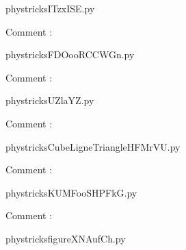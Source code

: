     \newcommand{\CaptionFigITzxISE}{<+Type your caption here+>}
    \begin{center}
        
    \end{center}
    phystricksITzxISE.py

    Comment : 

    \clearpage
    


    \newcommand{\CaptionFigFDOooRCCWGn}{<+Type your caption here+>}
    \begin{center}
        
    \end{center}
    phystricksFDOooRCCWGn.py

    Comment : 

    \clearpage
    


    \newcommand{\CaptionFigUZlaYZ}{<+Type your caption here+>}
    \begin{center}
        
    \end{center}
    phystricksUZlaYZ.py

    Comment : 

    \clearpage
    


    \newcommand{\CaptionFigCubeLigneTriangleHFMrVU}{<+Type your caption here+>}
    \begin{center}
        
    \end{center}
    phystricksCubeLigneTriangleHFMrVU.py

    Comment : 

    \clearpage
    


    \newcommand{\CaptionFigKUMFooSHPFkG}{<+Type your caption here+>}
    \begin{center}
        
    \end{center}
    phystricksKUMFooSHPFkG.py

    Comment : 

    \clearpage
    


    \newcommand{\CaptionFigfigureXNAufCh}{<+Type your caption here+>}
    \begin{center}
        
    \end{center}
    phystricksfigureXNAufCh.py

